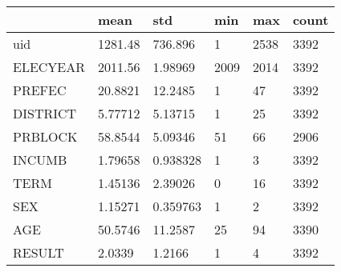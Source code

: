 \begin{tabular}{llllll}
\toprule
{} &      mean &       std &      min &   max & count \\
\midrule
uid           &   1281.48 &   736.896 &        1 &  2538 &  3392 \\
ELECYEAR      &   2011.56 &   1.98969 &     2009 &  2014 &  3392 \\
PREFEC        &   20.8821 &   12.2485 &        1 &    47 &  3392 \\
DISTRICT      &   5.77712 &   5.13715 &        1 &    25 &  3392 \\
PRBLOCK       &   58.8544 &   5.09346 &       51 &    66 &  2906 \\
INCUMB        &   1.79658 &  0.938328 &        1 &     3 &  3392 \\
TERM          &   1.45136 &   2.39026 &        0 &    16 &  3392 \\
SEX           &   1.15271 &  0.359763 &        1 &     2 &  3392 \\
AGE           &   50.5746 &   11.2587 &       25 &    94 &  3390 \\
RESULT        &    2.0339 &    1.2166 &        1 &     4 &  3392 \\
\bottomrule
\end{tabular}
